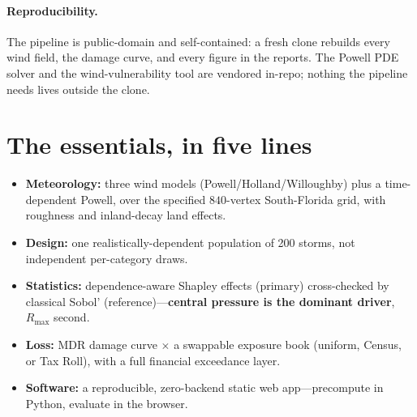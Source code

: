 \documentclass[11pt]{article}
\begin{document}
\paragraph{Reproducibility.} The pipeline is public-domain and self-contained: a fresh
clone rebuilds every wind field, the damage curve, and every figure in the reports.
The Powell PDE solver and the wind-vulnerability tool are vendored in-repo; nothing the
pipeline needs lives outside the clone.

\section{The essentials, in five lines}
\begin{itemize}
\item \textbf{Meteorology:} three wind models (Powell/Holland/Willoughby) plus a
      time-dependent Powell, over the specified $840$-vertex South-Florida grid, with
      roughness and inland-decay land effects.
\item \textbf{Design:} one realistically-dependent population of 200 storms, not
      independent per-category draws.
\item \textbf{Statistics:} dependence-aware Shapley effects (primary) cross-checked by
      classical Sobol' (reference)---\textbf{central pressure is the dominant driver},
      $R_{\max}$ second.
\item \textbf{Loss:} MDR damage curve $\times$ a swappable exposure book (uniform,
      Census, or Tax Roll), with a full financial exceedance layer.
\item \textbf{Software:} a reproducible, zero-backend static web app---precompute in
      Python, evaluate in the browser.
\end{itemize}
\end{document}
